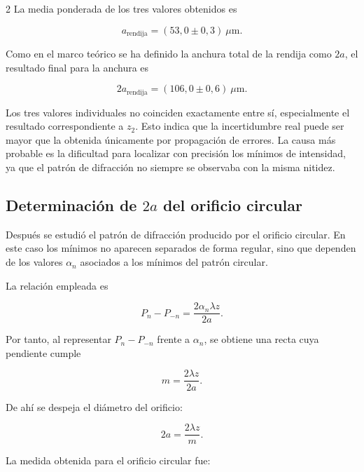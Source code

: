 \documentclass[12pt,a4paper]{article}
\begin{document}
\begin{multicols}{2}
\noindent
La media ponderada de los tres valores obtenidos es

\begin{equation*}
  a_{\text{rendija}} = (53{,}0 \pm 0{,}3)\ \mu\text{m}.
\end{equation*}

\noindent
Como en el marco teórico se ha definido la anchura total de la rendija como $2a$, el resultado final para la anchura es

\begin{equation*}
  2a_{\text{rendija}} = (106{,}0 \pm 0{,}6)\ \mu\text{m}.
\end{equation*}

\noindent
Los tres valores individuales no coinciden exactamente entre sí, especialmente el resultado correspondiente a $z_2$. Esto indica que la incertidumbre real puede ser mayor que la obtenida únicamente por propagación de errores. La causa más probable es la dificultad para localizar con precisión los mínimos de intensidad, ya que el patrón de difracción no siempre se observaba con la misma nitidez.
\subsection{\texorpdfstring{Determinación de $2a$ del orificio circular}{Determinación de 2a del orificio circular}}
\noindent
Después se estudió el patrón de difracción producido por el orificio circular. En este caso los mínimos no aparecen separados de forma regular, sino que dependen de los valores $\alpha_n$ asociados a los mínimos del patrón circular.

\noindent
La relación empleada es

\begin{equation}
  P_n-P_{-n} = \frac{2\alpha_n \lambda z}{2a}.
\end{equation}

\noindent
Por tanto, al representar $P_n-P_{-n}$ frente a $\alpha_n$, se obtiene una recta cuya pendiente cumple

\begin{equation}
  m = \frac{2\lambda z}{2a}.
\end{equation}

\noindent
De ahí se despeja el diámetro del orificio:

\begin{equation}
  2a = \frac{2\lambda z}{m}.
  \label{eq:diametro_orificio}
\end{equation}

\noindent
La medida obtenida para el orificio circular fue:


\end{multicols}
\end{document}
